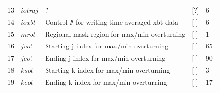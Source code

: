 \documentclass[a4paper]{article}
\begin{document}
\begin{itemize}
{\begin{longtable}{lllll}
  13   & $iotraj$    & ?                                                                & [?]                  & 6          \\
  14   & $ioxbt$     & Control \verb|#| for writing time averaged xbt data              & [-]                  & 6          \\
  15   & $mrot$      & Regional mask region for max/min overturning                     & [-]                  & 1          \\
  16   & $jsot$      & Starting j index for max/min overturning                         & [-]                  & 65          \\
  17   & $jeot$      & Ending j index for max/min overturning                           & [-]                  & 90          \\  
  18   & $ksot$      & Starting k index for max/min overturning                         & [-]                  & 3          \\  
  19   & $keot$      & Ending k index for max/min overturning                           & [-]                  & 17          \\ \hline 
   \end{longtable}}


\end{itemize}
\end{document}
